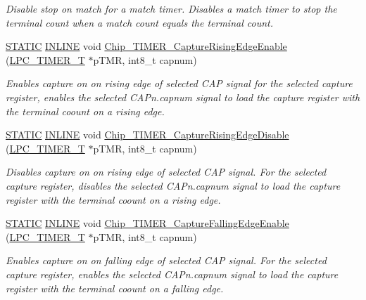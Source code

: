 \begin{DoxyCompactItemize}
\begin{DoxyCompactList}\small\item\em Disable stop on match for a match timer. Disables a match timer to stop the terminal count when a match count equals the terminal count. \end{DoxyCompactList}\item 
\hyperlink{group___l_p_c___types___public___macros_ga10b2d890d871e1489bb02b7e70d9bdfb}{S\+T\+A\+T\+IC} \hyperlink{spifi__18xx__43xx_8h_a2eb6f9e0395b47b8d5e3eeae4fe0c116}{I\+N\+L\+I\+NE} void \hyperlink{group___t_i_m_e_r__18_x_x__43_x_x_ga7768003112560a8cbd06582fa8747fae}{Chip\+\_\+\+T\+I\+M\+E\+R\+\_\+\+Capture\+Rising\+Edge\+Enable} (\hyperlink{struct_l_p_c___t_i_m_e_r___t}{L\+P\+C\+\_\+\+T\+I\+M\+E\+R\+\_\+T} $\ast$p\+T\+MR, int8\+\_\+t capnum)
\begin{DoxyCompactList}\small\item\em Enables capture on on rising edge of selected C\+AP signal for the selected capture register, enables the selected C\+A\+Pn.\+capnum signal to load the capture register with the terminal coount on a rising edge. \end{DoxyCompactList}\item 
\hyperlink{group___l_p_c___types___public___macros_ga10b2d890d871e1489bb02b7e70d9bdfb}{S\+T\+A\+T\+IC} \hyperlink{spifi__18xx__43xx_8h_a2eb6f9e0395b47b8d5e3eeae4fe0c116}{I\+N\+L\+I\+NE} void \hyperlink{group___t_i_m_e_r__18_x_x__43_x_x_ga25bcfd101f052ee941da5bae28d84fcd}{Chip\+\_\+\+T\+I\+M\+E\+R\+\_\+\+Capture\+Rising\+Edge\+Disable} (\hyperlink{struct_l_p_c___t_i_m_e_r___t}{L\+P\+C\+\_\+\+T\+I\+M\+E\+R\+\_\+T} $\ast$p\+T\+MR, int8\+\_\+t capnum)
\begin{DoxyCompactList}\small\item\em Disables capture on on rising edge of selected C\+AP signal. For the selected capture register, disables the selected C\+A\+Pn.\+capnum signal to load the capture register with the terminal coount on a rising edge. \end{DoxyCompactList}\item 
\hyperlink{group___l_p_c___types___public___macros_ga10b2d890d871e1489bb02b7e70d9bdfb}{S\+T\+A\+T\+IC} \hyperlink{spifi__18xx__43xx_8h_a2eb6f9e0395b47b8d5e3eeae4fe0c116}{I\+N\+L\+I\+NE} void \hyperlink{group___t_i_m_e_r__18_x_x__43_x_x_ga9938c5dc5cf1aa81064cf2e14ab29d44}{Chip\+\_\+\+T\+I\+M\+E\+R\+\_\+\+Capture\+Falling\+Edge\+Enable} (\hyperlink{struct_l_p_c___t_i_m_e_r___t}{L\+P\+C\+\_\+\+T\+I\+M\+E\+R\+\_\+T} $\ast$p\+T\+MR, int8\+\_\+t capnum)
\begin{DoxyCompactList}\small\item\em Enables capture on on falling edge of selected C\+AP signal. For the selected capture register, enables the selected C\+A\+Pn.\+capnum signal to load the capture register with the terminal coount on a falling edge. \end{DoxyCompactList}\item 

\end{DoxyCompactItemize}
